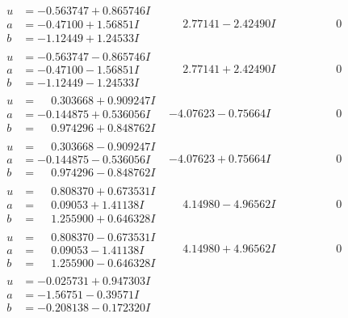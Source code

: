 \documentclass[1p]{elsarticle_modified}
\theoremstyle{definition}
\begin{document}
$$\begin{array}{c|c|c}
\begin{aligned}
u &= -0.563747 + 0.865746 I \\
a &= -0.47100 + 1.56851 I \\
b &= -1.12449 + 1.24533 I\end{aligned}
 & \phantom{-}2.77141 - 2.42490 I & \phantom{-0.000000 } 0 \\ \hline\begin{aligned}
u &= -0.563747 - 0.865746 I \\
a &= -0.47100 - 1.56851 I \\
b &= -1.12449 - 1.24533 I\end{aligned}
 & \phantom{-}2.77141 + 2.42490 I & \phantom{-0.000000 } 0 \\ \hline\begin{aligned}
u &= \phantom{-}0.303668 + 0.909247 I \\
a &= -0.144875 + 0.536056 I \\
b &= \phantom{-}0.974296 + 0.848762 I\end{aligned}
 & -4.07623 - 0.75664 I & \phantom{-0.000000 } 0 \\ \hline\begin{aligned}
u &= \phantom{-}0.303668 - 0.909247 I \\
a &= -0.144875 - 0.536056 I \\
b &= \phantom{-}0.974296 - 0.848762 I\end{aligned}
 & -4.07623 + 0.75664 I & \phantom{-0.000000 } 0 \\ \hline\begin{aligned}
u &= \phantom{-}0.808370 + 0.673531 I \\
a &= \phantom{-}0.09053 + 1.41138 I \\
b &= \phantom{-}1.255900 + 0.646328 I\end{aligned}
 & \phantom{-}4.14980 - 4.96562 I & \phantom{-0.000000 } 0 \\ \hline\begin{aligned}
u &= \phantom{-}0.808370 - 0.673531 I \\
a &= \phantom{-}0.09053 - 1.41138 I \\
b &= \phantom{-}1.255900 - 0.646328 I\end{aligned}
 & \phantom{-}4.14980 + 4.96562 I & \phantom{-0.000000 } 0 \\ \hline\begin{aligned}
u &= -0.025731 + 0.947303 I \\
a &= -1.56751 - 0.39571 I \\
b &= -0.208138 - 0.172320 I\end{aligned}

\end{array}$$
\end{document}
